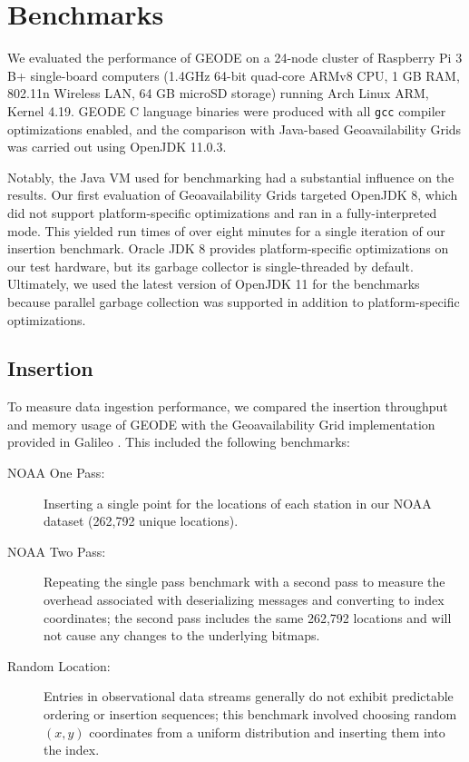 \section{Benchmarks}

We evaluated the performance of GEODE on a 24-node cluster of Raspberry Pi 3 B+ single-board computers (1.4GHz 64-bit quad-core ARMv8 CPU, 1 GB RAM, 
802.11n Wireless LAN, 64 GB microSD storage) running Arch Linux ARM, Kernel 4.19. GEODE C language binaries were produced with all \texttt{gcc} compiler optimizations enabled, and the comparison with Java-based Geoavailability Grids was carried out using OpenJDK 11.0.3.

Notably, the Java VM used for benchmarking had a substantial influence on the results. Our first evaluation of Geoavailability Grids targeted OpenJDK 8, which did not support platform-specific optimizations and ran in a fully-interpreted mode. This yielded run times of over eight minutes for a single iteration of our insertion benchmark. Oracle JDK 8 provides platform-specific optimizations on our test hardware, but its garbage collector is single-threaded by default. Ultimately, we used the latest version of OpenJDK 11 for the benchmarks because parallel garbage collection was supported in addition to platform-specific optimizations.

\subsection{Insertion}

To measure data ingestion performance, we compared the insertion throughput and memory usage of GEODE with the Geoavailability Grid implementation provided in Galileo \cite{malensek2013polygon}. This included the following benchmarks:

\begin{description}
\item[NOAA One Pass:] Inserting a single point for the locations of each station in our NOAA dataset (262,792 unique locations).
\item[NOAA Two Pass:] Repeating the single pass benchmark with a second pass to measure the overhead associated with deserializing messages and converting to index coordinates; the second pass includes the same 262,792 locations and will not cause any changes to the underlying bitmaps.
\item[Random Location:] Entries in observational data streams generally do not exhibit predictable ordering or insertion sequences; this benchmark involved choosing random $(x, y)$ coordinates from a uniform distribution and inserting them into the index.
\end{description}

